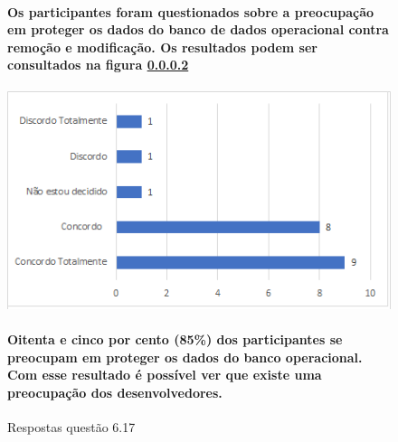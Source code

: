 \begin{figure}[t]
\centering
\paragraph{Os participantes foram questionados sobre a preocupação em proteger os dados do banco de dados operacional contra remoção e modificação. Os resultados podem ser consultados na figura \ref{fig:6.17}}
\includegraphics[scale=0.7]{figuras das questoes/6.17.png}
\caption{Respostas questão 6.17}
\paragraph{Oitenta e cinco por cento (85{\%}) dos participantes se preocupam em proteger os dados do banco operacional. Com esse resultado é possível ver que existe uma preocupação dos desenvolvedores.}
\label{fig:6.17}
\end{figure}




 

 

 
